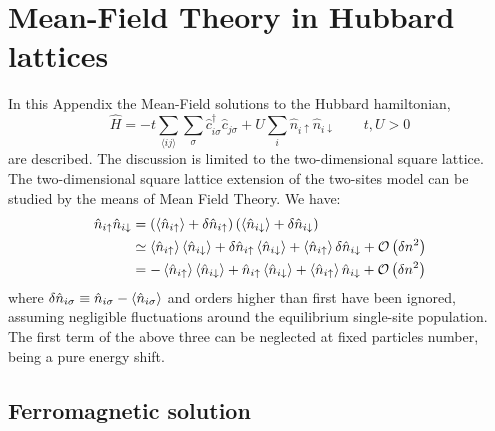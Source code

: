 \chapter{Mean-Field Theory in Hubbard lattices}\label{appendix:mean-field-hubbard}

In this Appendix the Mean-Field solutions to the Hubbard hamiltonian,
\[
	\hat H = 
	-t \sum_{\langle ij \rangle} \sum_\sigma \hat c_{i\sigma}^\dagger \hat c_{j\sigma}
	+ U \sum_i \hat n_{i\uparrow} \hat n_{i\downarrow}
	\qquad
	t, U  > 0
\]
are described. The discussion is limited to the two-dimensional square lattice. The two-dimensional square lattice extension of the two-sites model can be studied by the means of Mean Field Theory. We have:
\[
\begin{aligned}
	\hat n_{i\uparrow} \hat n_{i\downarrow} &= \left( \ev{\hat n_{i\uparrow}} + \delta \hat n_{i\uparrow} \right) \left( \ev{\hat n_{i\downarrow}} + \delta \hat n_{i\downarrow} \right) \\
	&\simeq \ev{\hat n_{i\uparrow}} \ev{\hat n_{i\downarrow}} +  \delta \hat n_{i\uparrow} \ev{\hat n_{i\downarrow}} + \ev{\hat n_{i\uparrow}} \delta \hat n_{i\downarrow} + \mathcal{O} \left(\delta n^2\right) \\
	&= - \ev{\hat n_{i\uparrow}} \ev{\hat n_{i\downarrow}} + \hat n_{i\uparrow} \ev{\hat n_{i\downarrow}} + \ev{\hat n_{i\uparrow}} \hat n_{i\downarrow} + \mathcal{O} \left(\delta n^2\right)
\end{aligned}
\]
where $\delta \hat n_{i\sigma} \equiv \hat n_{i\sigma} - \ev{\hat n_{i\sigma}}$ and orders higher than first have been ignored, assuming negligible fluctuations around the equilibrium single-site population. The first term of the above three can be neglected at fixed particles number, being a pure energy shift. 

\section{Ferromagnetic solution}

